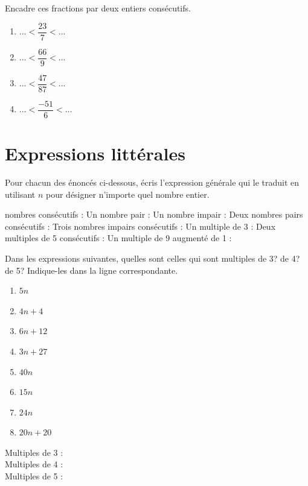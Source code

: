 \documentclass[../math2.tex]{subfiles}
\begin{document}
\begin{exercise}
    Encadre ces fractions par deux entiers consécutifs.
    \begin{enumerate}[cols=2]
        \item $ \dots < \dfrac{23}{7} < \dots $
        \item $ \dots < \dfrac{66}{9} < \dots $
        \item $ \dots < \dfrac{47}{87} < \dots $
        \item $ \dots < \dfrac{-51}{6} < \dots $
    \end{enumerate}
\end{exercise}

\newpage

\section{Expressions littérales}
Pour chacun des énoncés ci-dessous, écris l'expression générale qui le traduit en utilisant $n$ pour désigner n'importe quel nombre entier.
\begin{tasks}
     nombres consécutifs :\dotfill
    \task Un nombre pair :\dotfill
    \task Un nombre impair :\dotfill
    \task Deux nombres pairs consécutifs :\dotfill
    \task Trois nombres impairs consécutifs :\dotfill
    \task Un multiple de 3 :\dotfill
    \task Deux multiples de 5 consécutifs :\dotfill
    \task Un multiple de 9 augmenté de 1 :\dotfill
\end{tasks}

\begin{exercise}
    Dans les expressions suivantes, quelles sont celles qui sont multiples de 3?  de 4? de 5? Indique-les dans la ligne correspondante.
    \begin{enumerate}[cols=3]
        \item $5n$
        \item $4n+4$
        \item $6n+12$
        \item $3n+27$
        \item $40n$
        \item $15n$
        \item $24n$
        \item $20n+20$
    \end{enumerate}\medbreak
    Multiples de 3 : \\

    Multiples de 4 : \\

    Multiples de 5 : \\

\end{exercise}
\end{document}
